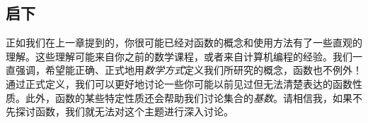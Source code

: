 
\subsection{启下}

正如我们在上一章提到的，你很可能已经对函数的概念和使用方法有了一些直观的理解。这些理解可能来自你之前的数学课程，或者来自计算机编程的经验。我们一直强调，希望能正确、正式地用\emph{数学方式}定义我们所研究的概念，函数也不例外！通过正式定义，我们可以更好地讨论一些你可能以前见过但无法清楚表达的函数性质。此外，函数的某些特定性质还会帮助我们讨论集合的\emph{基数}。请相信我，如果不先探讨函数，我们就无法对这个主题进行深入讨论。
